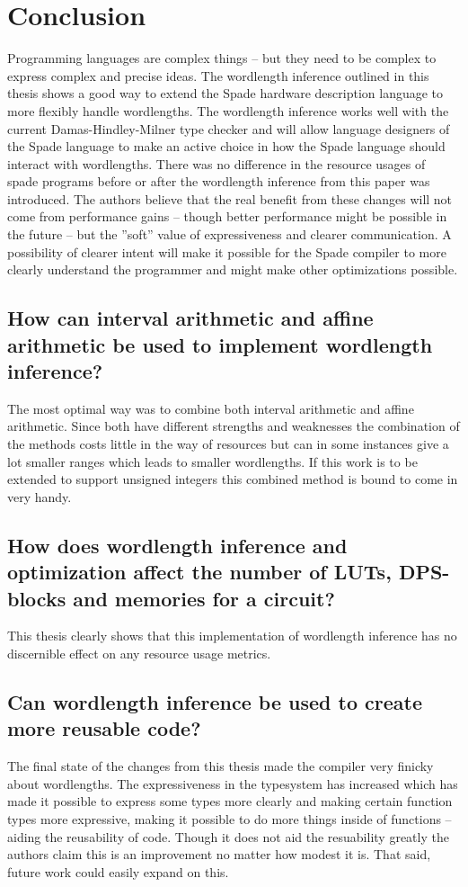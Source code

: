 \chapter{Conclusion}
\label{cha:Conclusion}
Programming languages are complex things -- but they need to be complex to express complex and precise ideas. The wordlength inference outlined in this thesis shows a good way to extend the Spade hardware description language to more flexibly handle wordlengths. The wordlength inference works well with the current Damas-Hindley-Milner type checker and will allow language designers of the Spade language to make an active choice in how the Spade language should interact with wordlengths. There was no difference in the resource usages of spade programs before or after the wordlength inference from this paper was introduced. The authors believe that the real benefit from these changes will not come from performance gains -- though better performance might be possible in the future -- but the ''soft'' value of expressiveness and clearer communication. A possibility of clearer intent will make it possible for the Spade compiler to more clearly understand the programmer and might make other optimizations possible.


\section{How can interval arithmetic and affine arithmetic be used to implement wordlength inference?}
The most optimal way was to combine both interval arithmetic and affine arithmetic. Since both have different strengths and weaknesses the combination of the methods costs little in the way of resources but can in some instances give a lot smaller ranges which leads to smaller wordlengths. If this work is to be extended to support unsigned integers this combined method is bound to come in very handy. 

\section{How does wordlength inference and optimization affect the number of LUTs, DPS-blocks and memories for a circuit?}
This thesis clearly shows that this implementation of wordlength inference has no discernible effect on any resource usage metrics.

\section{Can wordlength inference be used to create more reusable code?}
The final state of the changes from this thesis made the compiler very finicky about wordlengths. The expressiveness in the typesystem has increased which has made it possible to express some types more clearly and making certain function types more expressive, making it possible to do more things inside of functions -- aiding the reusability of code. Though it does not aid the resuability greatly the authors claim this is an improvement no matter how modest it is. That said, future work could easily expand on this.

